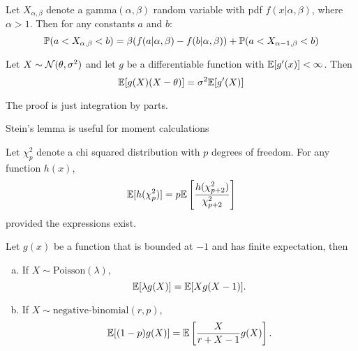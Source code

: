 \begin{theorem}
    Let $X_{\alpha, \beta}$ denote a gamma$(\alpha, \beta)$ random variable with pdf $f(x \vert{} \alpha, \beta)$, where $\alpha > 1$. Then for any constants $a$ and $b$:
    \[
        \P{}(a < X_{\alpha, \beta} < b) = \beta (f(a \vert{} \alpha, \beta) - f(b \vert{} \alpha, \beta)) + \P{}(a < X_{\alpha - 1, \beta} < b)
    \]
\end{theorem}

\begin{lemma}
    Let $X \sim \n(\theta, \sigma^2)$ and let $g$ be a differentiable function with $\E{}[g'(x)] < \infty$. Then
    \[
        \E{}[g(X)(X - \theta)] = \sigma^2 \E{}[g'(X)]
    \]
\end{lemma}
The proof is just integration by parts.

\begin{remark}
    Stein's lemma is useful for moment calculations
\end{remark}

\begin{theorem}
    Let $\chi^2_p$ denote a chi squared distribution with $p$ degrees of freedom. For any function $h(x)$,
    \[
        \E{}[h(\chi^2_p)] = p \E{}\left[\frac{h(\chi_{p+2}^2)}{\chi_{p+2}^2}\right]
    \]
    provided the expressions exist.
\end{theorem}

\begin{theorem}
    Let $g(x)$ be a function that is bounded at $-1$ and has finite expectation, then
    \begin{enumerate}[a.]
        \item If $X \sim \text{Poisson}(\lambda)$,
            \[
                \E{}[\lambda g(X)] = \E{}[Xg(X-1)].
            \]
        \item If $X\sim \text{negative-binomial}(r, p)$,
            \[
                \E{}[(1-p)g(X)] = \E{}\left[ \frac{X}{r + X - 1}g(X) \right].
            \]
    \end{enumerate}
\end{theorem}






